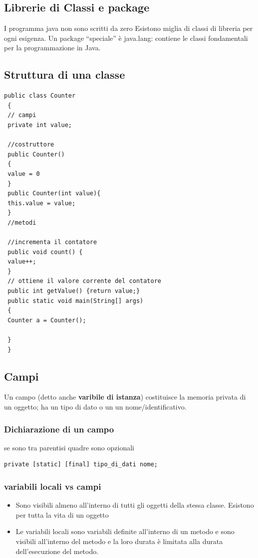 \documentclass[11pt]{article}
\begin{document}
\subsection{Librerie di Classi e package}
\label{sec:orgede7849}
I programma java non sono scritti da zero Esistono miglia di classi di libreria per ogni esigenza. Un package ``speciale'' è java.lang: contiene le classi fondamentali per la programmazione in Java.
\subsection{Struttura di una classe}
\label{sec:orge20f01c}
\begin{verbatim}
public class Counter
 {
 // campi
 private int value;

 //costruttore
 public Counter()
 {
 value = 0
 }
 public Counter(int value){
 this.value = value;
 }
 //metodi

 //incrementa il contatore
 public void count() {
 value++;
 }
 // ottiene il valore corrente del contatore
 public int getValue() {return value;}
 public static void main(String[] args)
 {
 Counter a = Counter();

 }
 }
\end{verbatim}
\subsection{Campi}
\label{sec:org6c59e74}
Un campo (detto anche \textbf{varibile di istanza}) costituisce la memoria privata di un oggetto; ha un tipo di dato o un un nome/identificativo.
\subsubsection{Dichiarazione di un campo}
\label{sec:orgca5e4ad}
se sono tra parentisi quadre sono opzionali
\begin{verbatim}
private [static] [final] tipo_di_dati nome;
\end{verbatim}
\subsubsection{variabili locali vs campi}
\label{sec:org98324da}
\begin{itemize}
\item Sono visibili almeno all'interno di tutti gli oggetti della stessa classe. Esistono per tutta la vita di un oggetto
\item Le variabili locali sono variabili definite all'interno di un metodo e sono visibili all'interno del metodo e la loro durata è limitata alla durata dell'esecuzione del metodo.
\end{itemize}
\end{document}
